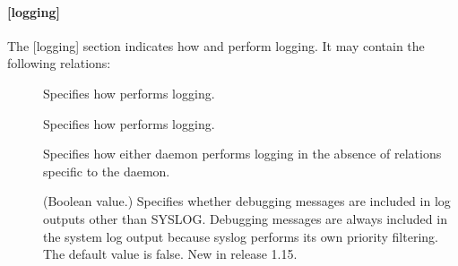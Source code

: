 \documentclass[letterpaper,10pt,english]{sphinxmanual}
\begin{document}
\paragraph{{[}logging{]}}
\label{\detokenize{admin/conf_files/kdc_conf:id4}}\label{\detokenize{admin/conf_files/kdc_conf:logging}}
The {[}logging{]} section indicates how {\hyperref[\detokenize{admin/admin_commands/krb5kdc:krb5kdc-8}]{}} and
{\hyperref[\detokenize{admin/admin_commands/kadmind:kadmind-8}]{}} perform logging.  It may contain the following
relations:
\begin{description}
\item[{}] \leavevmode
Specifies how {\hyperref[\detokenize{admin/admin_commands/kadmind:kadmind-8}]{}} performs logging.

\item[{}] \leavevmode
Specifies how {\hyperref[\detokenize{admin/admin_commands/krb5kdc:krb5kdc-8}]{}} performs logging.

\item[{}] \leavevmode
Specifies how either daemon performs logging in the absence of
relations specific to the daemon.

\item[{}] \leavevmode
(Boolean value.)  Specifies whether debugging messages are
included in log outputs other than SYSLOG.  Debugging messages are
always included in the system log output because syslog performs
its own priority filtering.  The default value is false.  New in
release 1.15.

\end{description}
\end{document}
